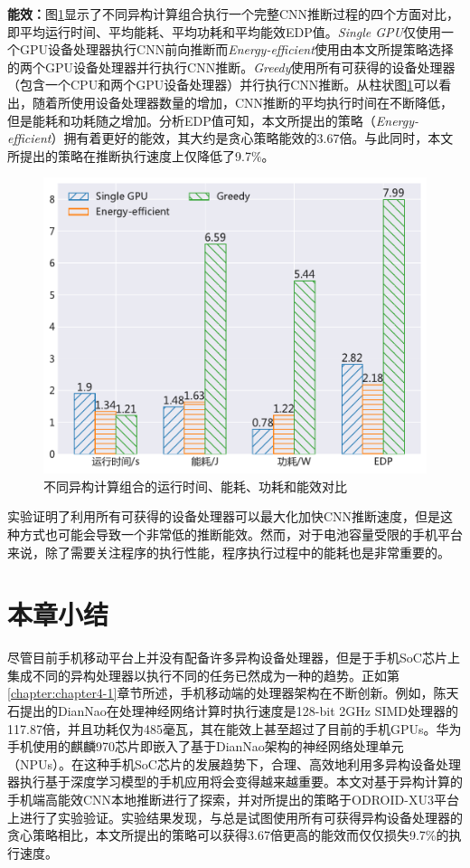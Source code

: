\textbf{能效：}图\ref{figure:figure35}显示了不同异构计算组合执行一个完整CNN推断过程的四个方面对比，即平均运行时间、平均能耗、平均功耗和平均能效EDP值。\emph{Single GPU}仅使用一个GPU设备处理器执行CNN前向推断而\emph{Energy-efficient}使用由本文所提策略选择的两个GPU设备处理器并行执行CNN推断。\emph{Greedy}使用所有可获得的设备处理器（包含一个CPU和两个GPU设备处理器）并行执行CNN推断。从柱状图\ref{figure:figure35}可以看出，随着所使用设备处理器数量的增加，CNN推断的平均执行时间在不断降低，但是能耗和功耗随之增加。分析EDP值可知，本文所提出的策略（\emph{Energy-efficient}）拥有着更好的能效，其大约是贪心策略能效的3.67倍。与此同时，本文所提出的策略在推断执行速度上仅降低了9.7\%。

\begin{figure}[htbp]
    \centering
    \includegraphics[height=0.4\textwidth]{figures/hc_gpu.pdf}
    \caption{不同异构计算组合的运行时间、能耗、功耗和能效对比}\label{figure:figure35}
\end{figure}

实验证明了利用所有可获得的设备处理器可以最大化加快CNN推断速度，但是这种方式也可能会导致一个非常低的推断能效。然而，对于电池容量受限的手机平台来说，除了需要关注程序的执行性能，程序执行过程中的能耗也是非常重要的\cite{brooks2000power}。

\section{本章小结}

尽管目前手机移动平台上并没有配备许多异构设备处理器，但是于手机SoC芯片上集成不同的异构处理器以执行不同的任务已然成为一种的趋势。正如第\ref{chapter:chapter4-1}章节所述，手机移动端的处理器架构在不断创新。例如，陈天石提出的DianNao在处理神经网络计算时执行速度是128-bit 2GHz SIMD处理器的117.87倍，并且功耗仅为485毫瓦\cite{chen2014diannao}，其在能效上甚至超过了目前的手机GPUs。华为手机使用的麒麟970芯片即嵌入了基于DianNao架构的神经网络处理单元（NPUs）。在这种手机SoC芯片的发展趋势下，合理、高效地利用多异构设备处理器执行基于深度学习模型的手机应用将会变得越来越重要。本文对基于异构计算的手机端高能效CNN本地推断进行了探索，并对所提出的策略于ODROID-XU3平台上进行了实验验证。实验结果发现，与总是试图使用所有可获得异构设备处理器的贪心策略相比，本文所提出的策略可以获得3.67倍更高的能效而仅仅损失9.7\%的执行速度。

\cleardoublepage